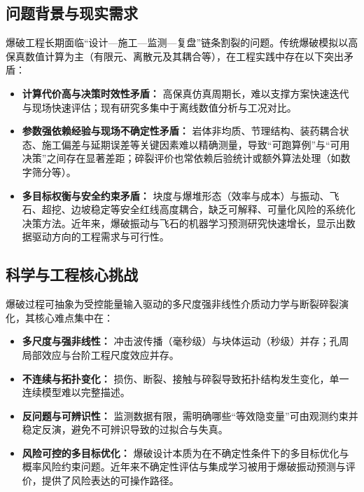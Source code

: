 \documentclass[12pt,a4paper,fontset=mac]{ctexart}
\begin{document}
\subsection{问题背景与现实需求}
爆破工程长期面临“设计—施工—监测—复盘”链条割裂的问题。传统爆破模拟以高保真数值计算为主（有限元、离散元及其耦合等），在工程实践中存在以下突出矛盾：
\begin{itemize}
  \item \textbf{计算代价高与决策时效性矛盾：} 高保真仿真周期长，难以支撑方案快速迭代与现场快速评估；现有研究多集中于离线数值分析与工况对比\cite{Rong2024InSituJointBlasting,Sun2025BifurcatedTunnelBlasting,Guan2024NonCutBlastScheme,Men2025WaterInrushFEMSPH}。
  \item \textbf{参数强依赖经验与现场不确定性矛盾：} 岩体非均质、节理结构、装药耦合状态、施工偏差与延期误差等关键因素难以精确测量，导致“可跑算例”与“可用决策”之间存在显著差距；碎裂评价也常依赖后验统计或额外算法处理（如数字筛分等）\cite{Song2025DigitalSievingFragmentation}。
  \item \textbf{多目标权衡与安全约束矛盾：} 块度与爆堆形态（效率与成本）与振动、飞石、超挖、边坡稳定等安全红线高度耦合，缺乏可解释、可量化风险的系统化决策方法。近年来，爆破振动与飞石的机器学习预测研究快速增长，显示出数据驱动方向的工程需求与可行性\cite{Hosseini2023PPVEnsemble,Komadja2022SustainabilityPPV,Chen2025CatBoostPPV,BozkurtKeser2025DeepEnsemblePPV,Taiwo2024FlyrockML,Mishra2023FlyrockHSV}。
\end{itemize}

\subsection{科学与工程核心挑战}
爆破过程可抽象为受控能量输入驱动的多尺度强非线性介质动力学与断裂碎裂演化，其核心难点集中在：
\begin{itemize}
  \item \textbf{多尺度与强非线性：} 冲击波传播（毫秒级）与块体运动（秒级）并存；孔周局部效应与台阶工程尺度效应并存。
  \item \textbf{不连续与拓扑变化：} 损伤、断裂、接触与碎裂导致拓扑结构发生变化，单一连续模型难以完整描述。
  \item \textbf{反问题与可辨识性：} 监测数据有限，需明确哪些“等效隐变量”可由观测约束并稳定反演，避免不可辨识导致的过拟合与失真。
  \item \textbf{风险可控的多目标优化：} 爆破设计本质为在不确定性条件下的多目标优化与概率风险约束问题。近年来不确定性评估与集成学习被用于爆破振动预测与评价，提供了风险表达的可操作路径\cite{BozkurtKeser2025DeepEnsemblePPV}。
\end{itemize}
\end{document}
